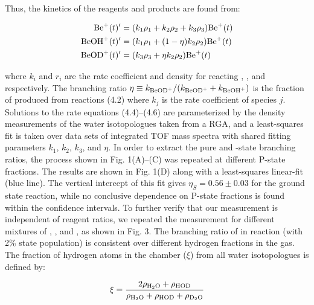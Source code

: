 Thus, the kinetics of the reagents and products are found from:

\begin{align}
	\ce{Be+}(t)' & = (k_1 \rho_1 + k_2 \rho_2 + k_3 \rho_3) \ce{Be+}(t) \\
	\ce{BeOH+}(t)' & = (k_1 \rho_1 + (1-\eta)k_2 \rho_2) \ce{Be+}(t) \\
	\ce{BeOD+}(t)' & = (k_3 \rho_3 + \eta k_2 \rho_2) \ce{Be+}(t)
\end{align}

where $k_i$ and $r_i$ are the rate coefficient and density for  reacting , , and  respectively. The branching ratio $\eta \equiv k_{\ce{BeOD+}}/(k_{\ce{BeOD+}} + k_{\ce{BeOH+}})$ is the fraction of  produced from reactions (4.2) where $k_j$ is the rate coefficient of species $j$. Solutions to the rate equations (4.4)–(4.6) are parameterized by the density measurements of the water isotopologues taken from a RGA, and a least-squares fit is taken over data sets of integrated TOF mass spectra with shared fitting parameters $k_1$, $k_2$, $k_3$, and $\eta$. In order to extract the pure  and -state branching ratios, the process shown in Fig. 1(A)–(C) was repeated at different P-state fractions. The results are shown in Fig. 1(D) along with a least-squares linear-fit (blue line). The vertical intercept of this fit gives $\eta_S = 0.56 \pm 0.03$ for the ground  state reaction, while no conclusive dependence on P-state fractions is found within the confidence intervals. To further verify that our measurement is independent of reagent ratios, we repeated the measurement for different mixtures of , , and , as shown in Fig. 3. The branching ratio of  in reaction  (with 2\%  state population) is consistent over different hydrogen fractions in the gas. The fraction of hydrogen atoms in the chamber ($\xi$) from all water isotopologues is defined by:

\begin{equation}
	\xi = \frac{2 \rho_{\ce{H2O}} + \rho_{\ce{HOD}}}{\rho_{\ce{H2O}} + \rho_{\ce{HOD}} + \rho_{\ce{D2O}}}
\end{equation}

